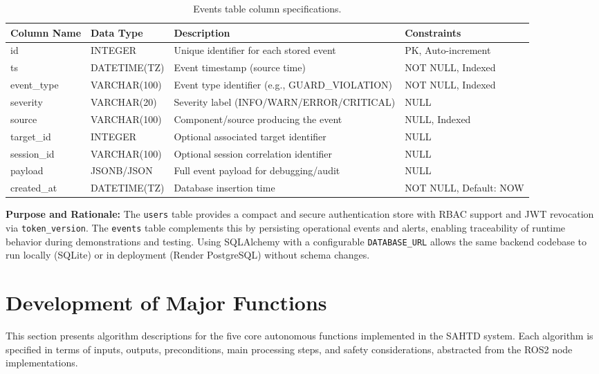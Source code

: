 \documentclass[12pt,a4paper]{report}
\begin{document}
\begin{table}[H]
\centering
\caption{Events table column specifications.}
\label{tab:events_table}
\begin{tabularx}{\textwidth}{@{}L{2.8cm} L{2.8cm} Y L{3.2cm}@{}}
\toprule
\textbf{Column Name} & \textbf{Data Type} & \textbf{Description} & \textbf{Constraints} \\
\midrule
id & INTEGER & Unique identifier for each stored event & PK, Auto-increment \\
ts & DATETIME(TZ) & Event timestamp (source time) & NOT NULL, Indexed \\
event\_type & VARCHAR(100) & Event type identifier (e.g., GUARD\_VIOLATION) & NOT NULL, Indexed \\
severity & VARCHAR(20) & Severity label (INFO/WARN/ERROR/CRITICAL) & NULL \\
source & VARCHAR(100) & Component/source producing the event & NULL, Indexed \\
target\_id & INTEGER & Optional associated target identifier & NULL \\
session\_id & VARCHAR(100) & Optional session correlation identifier & NULL \\
payload & JSONB/JSON & Full event payload for debugging/audit & NULL \\
created\_at & DATETIME(TZ) & Database insertion time & NOT NULL, Default: NOW \\
\bottomrule
\end{tabularx}
\end{table}

\endgroup

\textbf{Purpose and Rationale:}
The \texttt{users} table provides a compact and secure authentication store with RBAC support and JWT revocation via \texttt{token\_version}. The \texttt{events} table complements this by persisting operational events and alerts, enabling traceability of runtime behavior during demonstrations and testing. Using SQLAlchemy with a configurable \texttt{DATABASE\_URL} allows the same backend codebase to run locally (SQLite) or in deployment (Render PostgreSQL) without schema changes.




\FloatBarrier
\section{Development of Major Functions}
This section presents algorithm descriptions for the five core autonomous functions implemented in the SAHTD system. Each algorithm is specified in terms of inputs, outputs, preconditions, main processing steps, and safety considerations, abstracted from the \ac{ROS2} node implementations.
\end{document}
